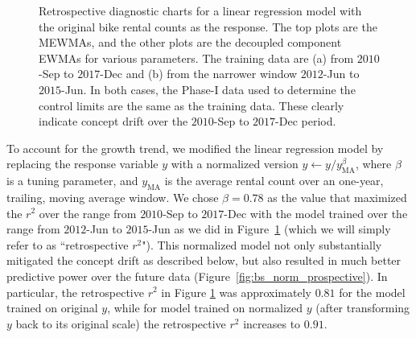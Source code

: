 \documentclass[twoside,11pt]{article}
\begin{document}
\begin{figure}[H]
\begin{subfigure}[t]{0.35\linewidth}
     \captionsetup{width=.95\linewidth}
     \caption{}
     \label{fig:bs_retro_narrow_train}
\end{subfigure}
\caption{Retrospective diagnostic charts for a linear regression model with the original bike rental counts as the response. The top plots are the MEWMAs, and the other plots are the decoupled component EWMAs for various parameters. The training data are (a) from $2010$-Sep to $2017$-Dec and (b) from the narrower window $2012$-Jun to $2015$-Jun. In both cases, the Phase-I data used to determine the control limits are the same as the training data. These clearly indicate concept drift over the $2010$-Sep to $2017$-Dec period.}
\label{fig:bike_sharing}
\end{figure}

To account for the growth trend, we modified the linear regression model by replacing the response variable $y$ with a normalized version  $y \leftarrow y/y_{\mathrm{MA}}^\beta$, where $\beta$ is a tuning parameter, and $y_{\mathrm{MA}}$ is the average rental count over an one-year, trailing, moving average window. We chose $\beta=0.78$ as the value that maximized the $r^2$ over the range from $2010$-Sep to $2017$-Dec with the model trained over the range from $2012$-Jun to $2015$-Jun as we did in Figure~\ref{fig:bs_retro_narrow_train} (which we will simply refer to as ``retrospective $r^2$"). %
This normalized model not only substantially mitigated the concept drift as described below, but also resulted in much better predictive power over the future data (Figure~\ref{fig:bs_norm_prospective}). In particular, the retrospective $r^2$ in Figure \ref{fig:bs_retro_narrow_train} was approximately $0.81$ for the model trained on original $y$, while for model trained on normalized $y$ (after transforming $y$ back to its original scale) the retrospective $r^2$ increases to $0.91$. %
\end{document}
